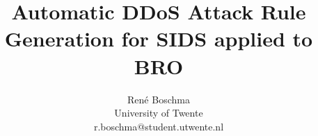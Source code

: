 \documentclass[10pt, a5paper]{article}
\begin{document}
 

\title{Automatic DDoS Attack Rule Generation for SIDS applied to BRO}
\author{René Boschma\\University of Twente\\r.boschma@student.utwente.nl}
\date{}
\maketitle


\newpage






\newpage


\end{document}
